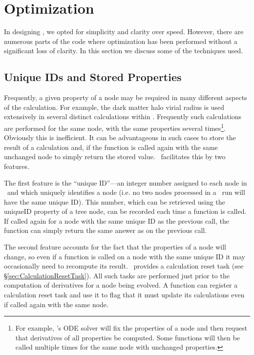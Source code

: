 \section{Optimization}\label{sec:Optimization}

In designing \glc, we opted for simplicity and clarity over speed. However, there are numerous parts of the code where optimization has been performed without a significant loss of clarity. In this section we discuss some of the techniques used.

\subsection{Unique IDs and Stored Properties}

Frequently, a given property of a node may be required in many different aspects of the calculation. For example, the dark matter halo virial radius is used extensively in several distinct calculations within \glc. Frequently such calculations are performed for the same node, with the same properties several times\footnote{For example, \glc's ODE solver will fix the properties of a node and then request that derivatives of all properties be computed. Some functions will then be called multiple times for the same node with unchanged properties.}. Obviously this is inefficient. It can be advantageous in such cases to store the result of a calculation and, if the function is called again with the same unchanged node to simply return the stored value. \glc\ facilitates this by two features.

The first feature is the ``unique ID''---an integer number assigned to each node in \glc\ and which uniquely identifies a node (i.e. no two nodes processed in a \glc\ run will have the same unique ID). This number, which can be retrieved using the {\normalfont \ttfamily uniqueID} property of a tree node, can be recorded each time a function is called. If called again for a node with the same unique ID as the previous call, the function can simply return the same answer as on the previous call.

The second feature accounts for the fact that the properties of a node will change, so even if a function is called on a node with the same unique ID it may occasionally need to recompute its result. \glc\ provides a calculation reset task (see \S\ref{sec:CalculationResetTask}). All such tasks are performed just prior to the computation of derivatives for a node being evolved. A function can register a calculation reset task and use it to flag that it must update its calculations even if called again with the same node.

